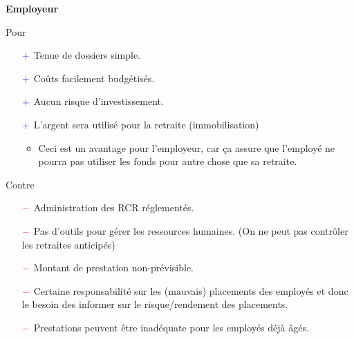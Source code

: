 \documentclass[10pt, french]{article}
\begin{document}
\begin{multicols*}{3}
\begin{center}
	\textbf{Employeur}
\end{center}
Pour
\begin{itemize}
	\item[$\color{blue}+$]	Tenue de dossiers simple.
	\item[$\color{blue}+$]	Coûts facilement budgétisés.
	\item[$\color{blue}+$]	Aucun risque d'investissement.
	\item[$\color{blue}+$]	L'argent sera utilisé pour la retraite (immobilisation)
		\begin{itemize}
		\item	Ceci est un avantage pour l'employeur, car ça assure que l'employé ne pourra pas utiliser les fonds pour autre chose que sa retraite.
		\end{itemize}
\end{itemize}

Contre
\begin{itemize}
	\item[$\color{red}-$]	Administration des RCR réglementés.
	\item[$\color{red}-$]	Pas d'outils pour gérer les ressources humaines. (On ne peut pas contrôler les retraites anticipés)
	\item[$\color{red}-$]	Montant de prestation non-prévisible.
	\item[$\color{red}-$]	Certaine responsabilité sur les (mauvais) placements des employés et donc le besoin des informer sur le risque/rendement des placements.
	\item[$\color{red}-$]	Prestations peuvent être inadéquate pour les employés déjà âgés.
\end{itemize}


\end{multicols*}
\end{document}
